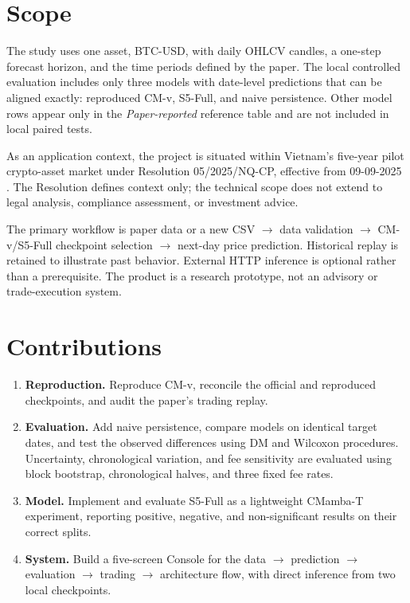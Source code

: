 \documentclass[13pt,a4paper,oneside]{report}
\begin{document}
\section{Scope}\label{sec:scope}
The study uses one asset, BTC-USD, with daily OHLCV candles, a one-step forecast horizon, and the
time periods defined by the paper. The local controlled evaluation includes only three models with
date-level predictions that can be aligned exactly: reproduced CM-v, S5-Full, and naive
persistence. Other model rows appear only in the \emph{Paper-reported} reference table and are not
included in local paired tests.

As an application context, the project is situated within Vietnam's five-year pilot crypto-asset
market under Resolution 05/2025/NQ-CP, effective from 09-09-2025 \cite{nq05}. The Resolution
defines context only; the technical scope does not extend to legal analysis, compliance
assessment, or investment advice.

The primary workflow is paper data or a new CSV $\to$ data validation $\to$ CM-v/S5-Full
checkpoint selection $\to$ next-day price prediction. Historical replay is retained to illustrate
past behavior. External HTTP inference is optional rather than a prerequisite. The product is a
research prototype, not an advisory or trade-execution system.

\section{Contributions}\label{sec:contrib}
\begin{enumerate}
\item \textbf{Reproduction.} Reproduce CM-v, reconcile the official and reproduced checkpoints, and
audit the paper's trading replay.
\item \textbf{Evaluation.} Add naive persistence, compare models on identical target dates, and test
the observed differences using DM and Wilcoxon procedures.
Uncertainty, chronological variation, and fee sensitivity are evaluated using block bootstrap,
chronological halves, and three fixed fee rates.
\item \textbf{Model.} Implement and evaluate S5-Full as a lightweight CMamba-T experiment, reporting
positive, negative, and non-significant results on their correct splits.
\item \textbf{System.} Build a five-screen Console for the
data $\to$ prediction $\to$ evaluation $\to$ trading $\to$ architecture flow, with direct
inference from two local checkpoints.
\end{enumerate}
\end{document}
